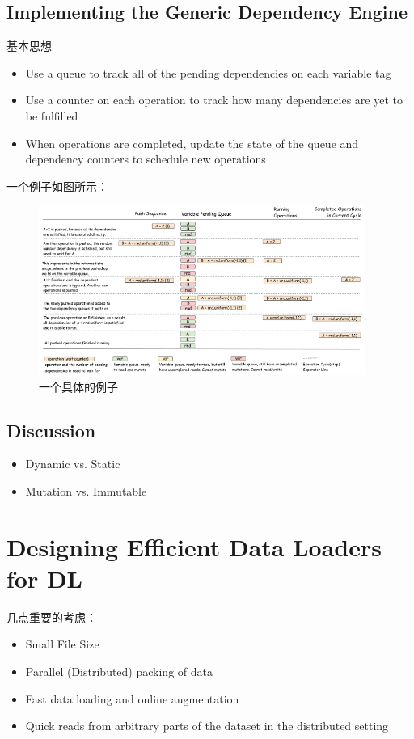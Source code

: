 \subsection{Implementing the Generic Dependency Engine}

基本思想
\begin{itemize}
\item Use a queue to track all of the pending dependencies on each variable tag
\item Use a counter on each operation to track how many dependencies are yet to be fulfilled
\item When operations are completed, update the state of the queue and dependency counters to schedule new operations
\end{itemize}

一个例子如图所示：
\begin{figure}[!hbtp]
\centering
\includegraphics[width=0.95\textwidth]{MXNet/Tag3.png}
\caption{一个具体的例子}
\label{Tag3.png}
\end{figure}

\subsection{Discussion}

\begin{itemize}
\item Dynamic vs. Static
\item Mutation vs. Immutable
\end{itemize}

\section{Designing Efficient Data Loaders for DL}

几点重要的考虑：
\begin{itemize}
\item Small File Size
\item Parallel (Distributed) packing of data
\item Fast data loading and online augmentation
\item Quick reads from arbitrary parts of the dataset in the distributed setting
\end{itemize}

